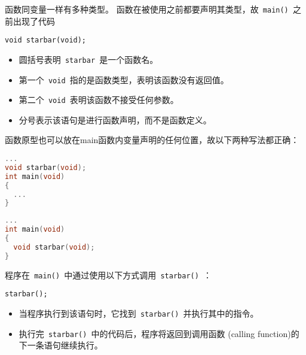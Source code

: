 \begin{frame}[fragile]

函数同变量一样有多种类型。 
函数在被使用之前都要声明其类型，故\lstinline| main() |之前出现了代码
\begin{lstlisting}[backgroundcolor=\color{red!10}]
void starbar(void);
\end{lstlisting}
\begin{itemize}
\item
圆括号表明\lstinline| starbar |是一个函数名。\\[0.1in]
\item 
第一个\lstinline| void |指的是函数类型，表明该函数没有返回值。\\[0.1in]
\item 
第二个\lstinline| void |表明该函数不接受任何参数。\\[0.1in]
\item 
分号表示该语句是进行函数声明，而不是函数定义。 
\end{itemize}
\end{frame}

\begin{frame}[fragile]
函数原型也可以放在main函数内变量声明的任何位置，故以下两种写法都正确：
\begin{lstlisting}[language=c,backgroundcolor=\color{red!10}]
...
void starbar(void);
int main(void)
{
  ...
}
\end{lstlisting}

\begin{lstlisting}[language=c,backgroundcolor=\color{red!10}]
...
int main(void)
{
  void starbar(void);
}
\end{lstlisting}

\end{frame}

\begin{frame}[fragile]
程序在\lstinline| main() |中通过使用以下方式调用\lstinline| starbar() |：
\begin{lstlisting}
starbar();
\end{lstlisting}
\begin{itemize}
\item
当程序执行到该语句时，它找到\lstinline| starbar() |并执行其中的指令。\\[0.1in]
\item 
执行完\lstinline| starbar() |中的代码后，程序将返回到调用函数{ (calling function)}的下一条语句继续执行。 
\end{itemize}
\end{frame}

